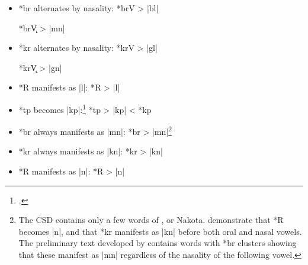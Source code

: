 \documentclass[output=paper]{LSP/langsci}
\begin{document}

\begin{itemize}
\item  *br alternates by nasality:  \hspace{1em} *brV	>	|bl|

\hspace{12em} *br\k{V}	>	|mn|

\item  *kr alternates by nasality: \hspace{1em}   *krV       >          |gl|

\hspace{12em} *kr\k{V}	>	|gn|
\item *R manifests as |l|: \hspace{4.5em} *R	>	|l|
\item *tp becomes |kp|:\footnote{\citealt[253, 265, 865]{Rankinetal2006PDF}.} \hspace{4.5em} *tp	>	|kp|	 <	*kp
 \end{itemize}
 
 
 \begin{itemize}
 \item  *br always manifests as |mn|:     \hspace{1.5em}  *br       >          |mn|\footnote{The CSD contains only a few words of , or Nakota.  \citet{ParksDeMallie1992} demonstrate that *R becomes |n|, and that *kr manifests as |kn| before both oral and nasal vowels.  The preliminary  text developed by \citet{Shields2012} contains words with *br clusters showing that these manifest as |mn| regardless of the nasality of the following vowel.}
 \item *kr always manifests as |kn|:       \hspace{1.6em}        *kr       >          |kn|
 \item *R manifests as |n|: \hspace{5.3em} *R	>	|n|
 \end{itemize}
  
 
\end{document}
